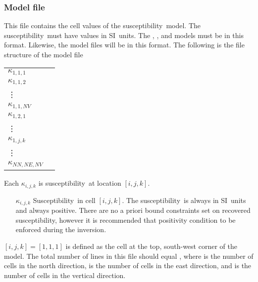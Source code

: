 \newcommand{\property}{susceptibility}
\newcommand{\propertycap}{Susceptibility}
\newcommand{\propunits}{SI}
\newcommand{\propgreek}{\kappa}

\subsubsection{Model file}
This file contains the cell values of the \property ~model. The \property ~must have values in \propunits ~units. The , , and  models must be in this format. Likewise, the  model files will be in this format. The following is the file structure of the model file
\begin{fileExample}
\begin{tabular}{|lc|}
\hline
$\propgreek_{1,1,1}$ & \\
$\propgreek_{1,1,2}$ & \\
\vdots & \\
$\propgreek_{1,1,NV}$ & \\
$\propgreek_{1,2,1}$ & \\
\vdots & \\
$\propgreek_{1,j,k}$ &\\
\vdots & \\
$\propgreek_{NN,NE,NV}$ & \\
\hline
\end{tabular}
\end{fileExample}
Each $\propgreek_{i,j,k}$ is \property ~at location $[i,j,k]$.

\begin{itemize}
\item[{$\propgreek_{i,j,k}$}] \propertycap ~in cell $[i, j, k]$. The \property ~is always in \propunits ~units and always positive. There are no a priori bound constraints set on recovered \property, however it is recommended that positivity condition to be enforced during the inversion.
\end{itemize}

$[i, j, k]=[1, 1, 1]$ is defined as the cell at the top, south-west corner of the model. The total number of lines in this file should equal , where  is the number of cells in the north direction,  is the number of cells in the east direction, and  is the number of cells in the vertical direction.
